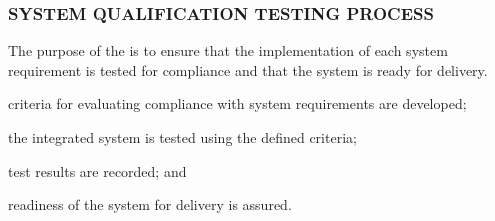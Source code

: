		\newpage
		\subsubsection{SYSTEM QUALIFICATION TESTING PROCESS\label{proc:system_qualification_testing_process}}

			\begin{adjustwidth}{2em}{0pt} 

				The purpose of the  is to ensure that the implementation of each system requirement is tested for compliance and that the system is ready for delivery.

			\end{adjustwidth}

			\begin{adjustwidth}{2em}{0pt} 

				\begin{compactitem}

					\item criteria for evaluating compliance with system requirements are developed;

					\item the integrated system is tested using the defined criteria;

					\item test results are recorded; and

					\item readiness of the system for delivery is assured.

				\end{compactitem}

			\end{adjustwidth}

